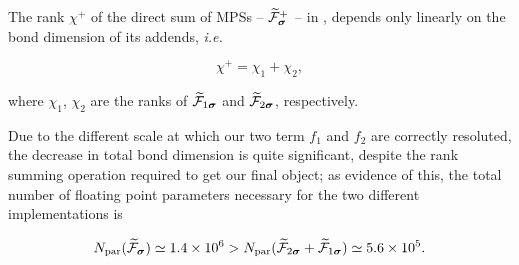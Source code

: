 The rank $\chi^+$ of the direct sum of MPSs -- $\widetilde{\mathcal{F}}^+_{\boldsymbol{\sigma}}$ -- in , depends only linearly on the bond dimension of its addends, \textit{i.e.}

\begin{equation}
	\chi^+ = \chi_1 + \chi_2,
\end{equation}

where $\chi_1$, $\chi_2$ are the ranks of $\widetilde{\mathcal{F}}_{1\boldsymbol{\sigma}}$ and $\widetilde{\mathcal{F}}_{2\boldsymbol{\sigma}}$, respectively. 

Due to the different scale at which our two term $f_1$ and $f_2$ are correctly resoluted, the decrease in total bond dimension is quite significant, despite the rank summing operation required to get our final object; as evidence of this, the total number of floating point parameters necessary for the two different implementations is 

\begin{equation}
	N_{\text{par}}(\widetilde{\mathcal{F}}_{\boldsymbol{\sigma}}) \simeq 1.4 \times 10^6 > N_{\text{par}}(\widetilde{\mathcal{F}}_{2\boldsymbol{\sigma}} + \widetilde{\mathcal{F}}_{1\boldsymbol{\sigma}}) \simeq 5.6 \times 10^5.
	\label{eq:naiveLocalFuncMemorySave}
\end{equation}




